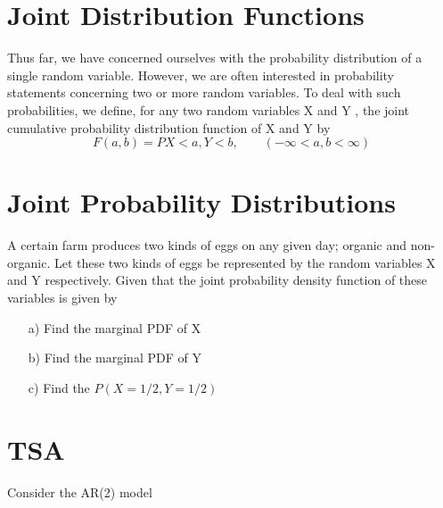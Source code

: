 \begin{enumerate}
\section{Joint Distribution Functions }

Thus far, we have concerned ourselves with the probability distribution of a single random variable. However, we are often
interested in probability statements concerning two or more random variables. To deal with such probabilities, we define, for any two
random variables X and Y , the joint cumulative probability distribution function of X and Y by
\\
\begin{equation}
F(a,b) = P{X < a,Y < b},\qquad (-\infty < a,b < \infty)
\end{equation}




\section{Joint Probability Distributions}	
A certain farm produces two kinds of eggs on any given day; organic and non-organic. 
Let these two kinds of eggs be represented by the random variables X and Y respectively. 
Given that the joint probability density function of these variables is given by


\begin{itemize}
	\item[a)] Find the marginal PDF of X
	
	\item[b)] Find the marginal PDF of Y
	
	\item[c)] Find the $P(X = 1/2, Y = 1/2)$
\end{itemize}


%	
%		
\section{TSA}
Consider the AR(2) model



\end{enumerate}
